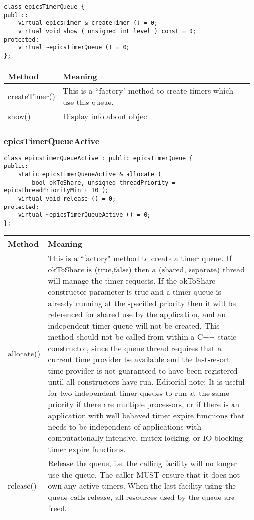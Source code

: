 \begin{verbatim}
class epicsTimerQueue {
public:
    virtual epicsTimer & createTimer () = 0;
    virtual void show ( unsigned int level ) const = 0;
protected:
    virtual ~epicsTimerQueue () = 0;
};\end{verbatim}
\begin{center}
\begin{longtable}{p{1.1in}p{5.0in}}
\textbf{Method} & \textbf{Meaning}\\
\hline
createTimer() & This is a ``factory" method to create timers which use this queue.\\
show() & Display info about object
\end{longtable}

\end{center}


\subsubsection{epicsTimerQueueActive}

\begin{verbatim}
class epicsTimerQueueActive : public epicsTimerQueue {
public:
    static epicsTimerQueueActive & allocate (
        bool okToShare, unsigned threadPriority = epicsThreadPriorityMin + 10 );
    virtual void release () = 0;
protected:
    virtual ~epicsTimerQueueActive () = 0;
};
\end{verbatim}

\begin{center}
\begin{longtable}{p{1.1in}p{5.0in}}
\textbf{Method} & \textbf{Meaning}\\
\hline
allocate() &
This is a ``factory" method to create a timer queue.
If okToShare is (true,false) then a (shared, separate) thread will manage the timer requests.
If the okToShare constructor parameter is true and a timer queue is already running at the specified priority then it will be referenced for shared use by the application, and an independent timer queue will not be created.
This method should not be called from within a C++ static constructor, since the queue thread requires that a current time provider be available and the last-resort time provider is not guaranteed to have been registered until all constructors have run.
Editorial note: It is useful for two independent timer queues to run at the same priority if there are multiple processors, or if there is an application with well behaved timer expire functions that needs to be independent of applications with computationally intensive, mutex locking, or IO blocking timer expire functions. \\

release() &
Release the queue, i.e. the calling facility will no longer use the queue.
The caller MUST ensure that it does not own any active timers.
When the last facility using the queue calls release, all resources used by the queue are freed.
\end{longtable}

\end{center}



